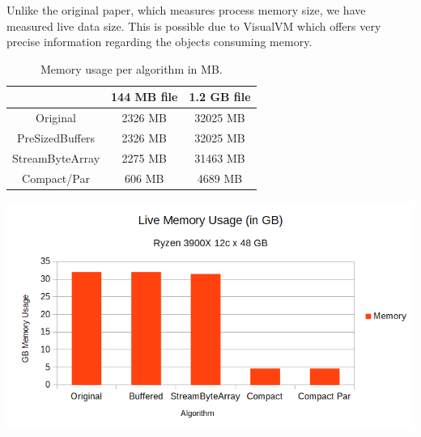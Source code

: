 \documentclass[a4paper,twoside]{article}
\begin{document}
Unlike the original paper, which measures process memory size, we have measured live data size.
This is possible due to VisualVM which offers very precise information regarding the objects consuming memory.



\begin{table}[h]
	\caption{Memory usage per algorithm in MB.}\centering
	\begin{tabular}{|c|c|c|}
		\hline			  	& 144 MB file		& 1.2 GB file		\\ \hline
		Original			& 2326 MB			& 32025 MB			\\ \hline
		PreSizedBuffers		& 2326 MB			& 32025 MB			\\ \hline
		StreamByteArray 	& 2275 MB			& 31463 MB			\\ \hline
		Compact/Par			& 606 MB			& 4689 MB			\\ \hline
	\end{tabular}
\end{table}

\begin{center}
	\includegraphics[scale=0.5]{images/memory_usage_1_2G.png}
\end{center}
\end{document}

